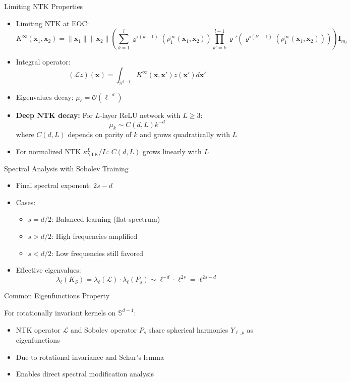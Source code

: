 \documentclass{beamer}
\begin{document}
\begin{frame}{Limiting NTK Properties}
\begin{itemize}
\item Limiting NTK at EOC:
\[ K^{\infty}(\mathbf{x}_1, \mathbf{x}_2) = \|\mathbf{x}_1\| \|\mathbf{x}_2\| \left( \sum_{k=1}^l \varrho^{\circ (k-1)}\left(\rho_1^{\infty}(\mathbf{x}_1, \mathbf{x}_2)\right) \prod_{k'=k}^{l-1} \varrho'\left(\varrho^{\circ (k'-1)}\left(\rho_1^{\infty}(\mathbf{x}_1, \mathbf{x}_2)\right)\right) \right) \mathbf{I}_{m_l} \]
\item Integral operator:
\[ (\mathcal{L} z)(\mathbf{x}) = \int_{\mathbb{S}^{d-1}} K^{\infty}(\mathbf{x}, \mathbf{x}') z(\mathbf{x}') d\mathbf{x}' \]
\item Eigenvalues decay: $\mu_\ell = \mathcal{O}(\ell^{-d})$
\item \textbf{Deep NTK decay:} For $L$-layer ReLU network with $L \geq 3$:
\[ \mu_k \sim C(d, L)k^{-d} \]
where $C(d, L)$ depends on parity of $k$ and grows quadratically with $L$
\item For normalized NTK $\kappa^L_{\text{NTK}}/L$: $C(d, L)$ grows linearly with $L$
\end{itemize}
\end{frame}

\begin{frame}{Spectral Analysis with Sobolev Training}
\begin{itemize}
\item Final spectral exponent: $2s-d$
\item Cases:
\begin{itemize}
\item $s = d/2$: Balanced learning (flat spectrum)
\item $s > d/2$: High frequencies amplified
\item $s < d/2$: Low frequencies still favored
\end{itemize}
\item Effective eigenvalues:
\[ \lambda_\ell(K_S) = \lambda_\ell(\mathcal{L}) \cdot \lambda_\ell(P_s) \sim \ell^{-d} \cdot \ell^{2s} = \ell^{2s-d} \]
\end{itemize}
\end{frame}

\begin{frame}{Common Eigenfunctions Property}
\begin{theorem}
For rotationally invariant kernels on $\mathbb{S}^{d-1}$:
\begin{itemize}
\item NTK operator $\mathcal{L}$ and Sobolev operator $P_s$ share spherical harmonics $Y_{\ell,p}$ as eigenfunctions
\item Due to rotational invariance and Schur's lemma
\item Enables direct spectral modification analysis
\end{itemize}
\end{theorem}
\end{frame}
\end{document}
